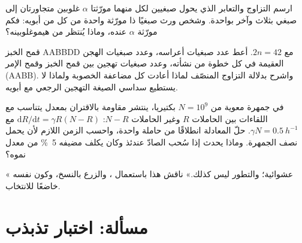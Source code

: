 \begin{exercise}[$\star\star$]\label{exo:b2:genome-diversification:9}
ارسم التزاوج والتعابر الذي يحول صبغيين لكل منهما مورّثتا $\alpha$
غلوبين متجاورتان إلى صبغي بثلاث وآخر بواحدة. وشخص ورث صبغيًا ذا
مورّثة واحدة من كل من أبويه: فكم مورّثة $\alpha$ عنده، وماذا يُنتظر من
هيموغلوبينه؟
\end{exercise}

\begin{exercise}[$\star\star\star$]\label{exo:b2:genome-diversification:10}
قمح الخبز AABBDD مع $2n = 42$. أعط عدد صبغيات أعراسه، وعدد صبغيات
الهجن العقيمة في كل خطوة من نشأته، وعدد صبغيات تهجين بين قمح الخبز
وقمح الإمر (AABB). واشرح بدلالة التزاوج المنصّف لماذا أعادت كل
مضاعفة الخصوبة ولماذا لا يستطيع سداسي الصيغة التهجين الرجعي مع
أبويه.
\end{exercise}

\begin{exercise}[$\star\star\star$]\label{exo:b2:genome-diversification:11}
في جمهرة معوية من $N = 10^{9}$ بكتيريا، ينتشر  مقاومة
بالاقتران بمعدل يتناسب مع اللقاءات بين الحاملات $R$ وغير الحاملات
$N - R$: $\mathrm{d}R/\mathrm{d}t =
\gamma R (N - R)$ مع $\gamma N = \qty{0.5}{h^{-1}}$. حلّ المعادلة
انطلاقًا من حاملة واحدة، واحسب الزمن اللازم لأن يحمل  نصف
الجمهرة. وماذا يحدث إذا سُحب الصادّ عندئذ وكان  يكلف مضيفه
\qty{5}{\%} من معدل نموه؟
\end{exercise}

\begin{exercise}[$\star\star\star$]\label{exo:b2:genome-diversification:12}
« عشوائية؛ والتطور ليس كذلك.» ناقش هذا باستعمال ، والزرع بالنسخ، وكون  نفسه خاضعًا للانتخاب.
\end{exercise}

\section{مسألة: اختبار تذبذب}

